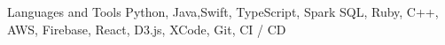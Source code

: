 

\begin{cvskills}

  \cvskill
  {Languages and Tools} %
  {Python, Java,Swift, TypeScript, Spark SQL, Ruby, C++, AWS, Firebase, React, D3.js, XCode, Git, CI / CD} %

\end{cvskills}